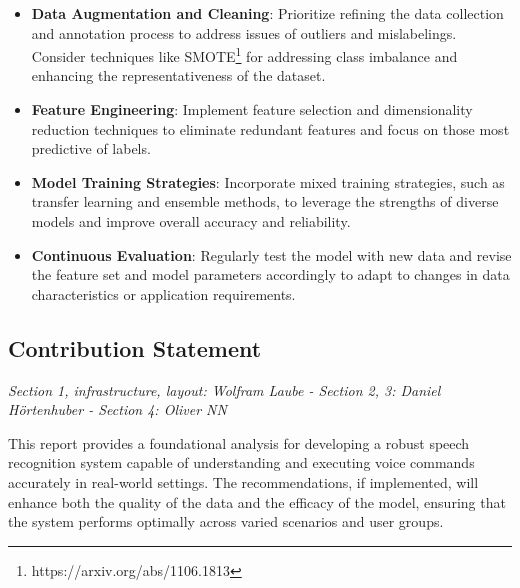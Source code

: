 \begin{itemize}
    \item \textbf{Data Augmentation and Cleaning}:
    Prioritize refining the data collection and annotation process to address issues
    of outliers and mislabelings.
    Consider techniques like SMOTE\footnote{https://arxiv.org/abs/1106.1813} for addressing
    class imbalance and enhancing the representativeness of the dataset.
    \item \textbf{Feature Engineering}:
    Implement feature selection and dimensionality reduction techniques to eliminate
    redundant features and focus on those most predictive of labels.
    \item \textbf{Model Training Strategies}:
    Incorporate mixed training strategies, such as transfer learning and ensemble methods,
    to leverage the strengths of diverse models and improve overall accuracy and reliability.
    \item \textbf{Continuous Evaluation}:
    Regularly test the model with new data and revise the feature set and model parameters
    accordingly to adapt to changes in data characteristics or application requirements.
\end{itemize}

\subsection{Contribution Statement}

\textit{Section 1, infrastructure, layout: Wolfram Laube - Section 2, 3: Daniel Hörtenhuber - Section 4: Oliver NN
}

This report provides a foundational analysis for developing a robust speech recognition system
capable of understanding and executing voice commands accurately in real-world settings.
The recommendations, if implemented, will enhance both the quality of the data and the efficacy
of the model, ensuring that the system performs optimally across varied scenarios and user groups.
